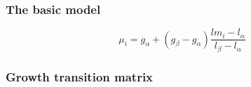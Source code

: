 \subsubsection{The basic model}\label{sec:GrowthIncrement-Basic}

\begin{equation}
\mu_i = g_\alpha + (g_\beta - g_\alpha) \frac{lm_i - l_\alpha}{l_\beta - l_\alpha}
\end{equation}

%
%

\subsubsection{Growth transition matrix}\label{sec:GrowthIncrement-GrowthMatrix}

